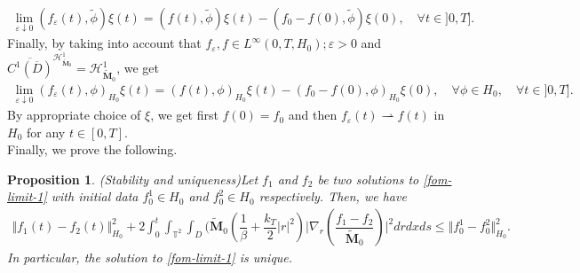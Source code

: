 \documentclass[a4paper,12pt, reqno]{amsart}
\newtheorem{proposition}[theorem]{Proposition}
\begin{document}
     \begin{align}
          \lim_{\varepsilon \downarrow 0}  (  f_\varepsilon(t) ,\widetilde{\phi})\xi(t)=(  f(t) ,\widetilde{\phi})\xi(t)- ( f_0- f(0) ,\widetilde{\phi})\xi(0), \quad \forall t\in ]0,T].
    \end{align}
  Finally, by taking into account that $f_\varepsilon, f\in L^\infty(0,T,H_0); \varepsilon>0$ and  $    \overline{C^1(\overline{D})}^{\mathcal{H}^1_{\widetilde{\mathbf{M}}_0}}=\mathcal{H}^1_{\widetilde{\mathbf{M}}_0}$, we get
    \begin{align}
          \lim_{\varepsilon \downarrow 0}  (  f_\varepsilon(t) ,\phi)_{H_0}\xi(t)=(  f(t) ,\phi)_{H_0}\xi(t)- ( f_0- f(0) ,\phi)_{H_0}\xi(0), \quad  \forall \phi\in H_0, \quad \forall t\in ]0,T].
    \end{align}
    By appropriate choice of $\xi$, we get first $f(0)=f_0$ and then $f_\varepsilon(t)  \rightharpoonup f(t)$  in $H_0$ for any $t\in [0,T].$\\
 Finally,  we prove the following.
  \begin{proposition}(Stability and uniqueness)\label{propo-stab-}
      Let $f_1$ and $f_2$ be two solutions to  \eqref{fom-limit-1} with initial data $f_0^1\in H_0$ and $f_0^2\in H_0$ respectively. Then, we have
      \begin{align*}
          \Vert f_1(t)-f_2(t)\Vert_{H_0}^2+2\int_0^t\int_{\mathbb{T}^2}\int_D\bigl(\widetilde{\mathbf{M}}_0 (\dfrac{1}{\beta}+\dfrac{k_T}{2}\vert r\vert^2)\vert \nabla_r(\dfrac{f_1-f_2}{\widetilde{\mathbf{M}}_0})\vert^2 drdxds \leq   \Vert f_0^1-f_0^2\Vert_{H_0}^2.
      \end{align*}
      In particular, the solution to \eqref{fom-limit-1} is unique.
  \end{proposition}
\end{document}
